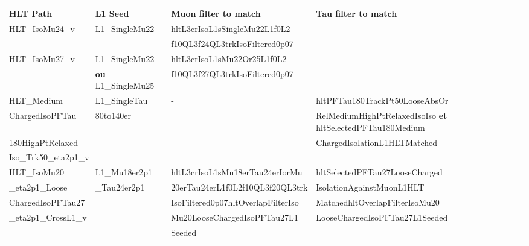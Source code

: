 {\footnotesize
\begin{tabularx}{\textwidth}{llXX}
\toprule
HLT Path & L1 Seed & Muon filter to match & Tau filter to match \\
\midrule
HLT\_IsoMu24\_v
&
L1\_SingleMu22
&
hltL3crIsoL1sSingleMu22L1f0L2
&
-
\\
&
&
f10QL3f24QL3trkIsoFiltered0p07
\\\hline
HLT\_IsoMu27\_v
&
L1\_SingleMu22
&
hltL3crIsoL1sMu22Or25L1f0L2
&
-
\\
&
\textbf{ou} L1\_SingleMu25
&
f10QL3f27QL3trkIsoFiltered0p07
\\\hline
HLT\_Medium
&
L1\_SingleTau
&
-
&
hltPFTau180TrackPt50LooseAbsOr
\\
ChargedIsoPFTau
&
80to140er
&
&
RelMediumHighPtRelaxedIsoIso \textbf{et} hltSelectedPFTau180Medium
\\
180HighPtRelaxed
&
&
&
ChargedIsolationL1HLTMatched
\\
\multicolumn{2}{l}{Iso\_Trk50\_eta2p1\_v}
\\\hline
HLT\_IsoMu20
&
L1\_Mu18er2p1
&
hltL3crIsoL1sMu18erTau24erIorMu
&
hltSelectedPFTau27LooseCharged
\\
\_eta2p1\_Loose
&
\_Tau24er2p1
&
20erTau24erL1f0L2f10QL3f20QL3trk\!\!
&
IsolationAgainstMuonL1HLT
\\
ChargedIsoPFTau27
&
&
IsoFiltered0p07hltOverlapFilterIso
&
MatchedhltOverlapFilterIsoMu20
\\
\_eta2p1\_CrossL1\_v
&
&
Mu20LooseChargedIsoPFTau27L1
&
LooseChargedIsoPFTau27L1Seeded
\\
&
&
Seeded
\\
\bottomrule
\end{tabularx}
}